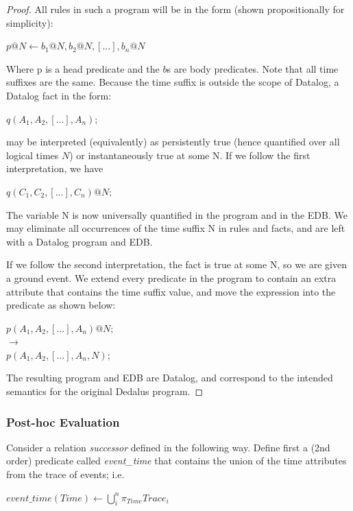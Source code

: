 \begin{proof}
All rules in such a program will be in the form (shown propositionally for simplicity): 

$p@N \leftarrow b_{1}@N, b_{2}@N, [...], b_{n}@N$

Where p is a head predicate and the $b$s are body predicates.  Note that all time suffixes are 
the same.  Because the time suffix is outside the scope of Datalog, a Datalog fact in the form:

$q(A_{1}, A_{2}, [...], A_{n});$

may be interpreted (equivalently) as persistently true (hence quantified over all logical times $N$) or instantaneously
true at some N.  If we follow the first interpretation, we have 

$q(C_{1}, C_{2}, [...], C_{n})@N;$

The variable N is now universally quantified in the program and in the EDB.  We may eliminate all occurrences of the time suffix N
in rules and facts, and are left with a Datalog program and EDB.

If we follow the second interpretation, the fact is true at some N, so we are given a ground event.  We extend every predicate in 
the program to contain an extra attribute that contains the time suffix value, and move the expression into the predicate as shown below:

$p(A_{1}, A_{2}, [...], A_{n})@N;$\\
$\rightarrow$\\
$p(A_{1}, A_{2}, [...], A_{n}, N);$

The resulting program and EDB are Datalog, and correspond to the intended semantics for the original Dedalus program.

\end{proof}


\subsubsection{Post-hoc Evaluation}

Consider a relation \emph{successor} defined in the following way.
Define first a (2nd order) predicate called \emph{event\_time} 
that contains the union of the time attributes from the trace of events; i.e.

$event\_time(Time) \leftarrow \displaystyle\bigcup_{i}^n \pi_{Time}Trace_{i}$

